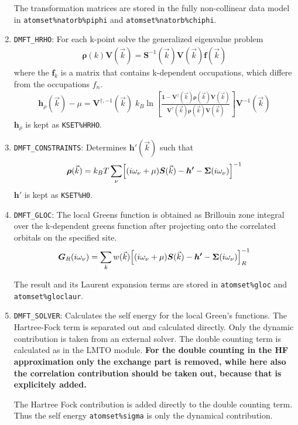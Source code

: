 \documentclass[11pt,a4paper]{report}
\newcommand{\mat}[1]{\bm{#1}}  %
\begin{document}
\begin{enumerate}
The transformation matrices are stored in the fully non-collinear data
model in \verb|atomset%natorb%piphi| and \verb|atomset%natorb%chiphi|.
%
\item \verb|DMFT_HRHO|: For each k-point solve the generalized
  eigenvalue problem
\begin{eqnarray*}
\mat{\rho}(k)\mat{V}(\vec{k})=
\mat{S}^{-1}(\vec{k})\mat{V}(\vec{k})\mat{f}(\vec{k})
\end{eqnarray*}
where the $\mat{f}_k$ is a matrix that contains k-dependent
occupations, which differe from the occupations $f_n$.
\begin{eqnarray}
\mat{h}_\rho(\vec{k})-\mu=\mat{V}^{\dagger,-1}(\vec{k})\; k_B
\ln\left[
\frac{\mat{1}-\mat{V}^\dagger(\vec{k})\mat{\rho}(\vec{k})\mat{V}(\vec{k})}
{\mat{V}^\dagger(\vec{k})\mat{\rho}(\vec{k})\mat{V}(\vec{k})}
\right]\mat{V}^{-1}(\vec{k})
\end{eqnarray}
$\mat{h}_\rho$ is kept as \verb|KSET%HRHO|.
%
\item \verb|DMFT_CONSTRAINTS|: Determines $\mat{h}'(\vec{k})$ such that
\begin{eqnarray}
\mat{\rho}(\vec{k})=k_BT\sum_\nu \Bigl[(i\omega_\nu+\mu)\mat{S}(\vec{k})-
\mat{h'}-\mat{\Sigma}(i\omega_\nu)\Bigr]^{-1}
\end{eqnarray}
$\mat{h'}$ is kept as \verb|KSET%H0|.
%
\item \verb|DMFT_GLOC|: The local Greens function is obtained as
  Brillouin zone integral over the k-dependent greens function after
  projecting onto the correlated orbitals on the specified site.
\begin{eqnarray}
\mat{G}_R(i\omega_\nu)=\sum_k w(\vec{k})
\Bigl[(i\omega_\nu+\mu)\mat{S}(\vec{k})-
\mat{h'}-\mat{\Sigma}(i\omega_\nu)\Bigr]^{-1}_R
\end{eqnarray}

The result and its Laurent expansion terms are stored in
\verb|atomset%gloc| and \verb|atomset%gloclaur|.
%
\item \verb|DMFT_SOLVER|: Calculates the self energy for the local
  Green's functions. The Hartree-Fock term is separated out and
  calculated directly. Only the dynamic contribution is taken from an
  external solver. The double counting term is calculated as in the
  LMTO module. \textbf{For the double counting in the HF approximation
    only the exchange part is removed, while here also the correlation
    contribution should be taken out, because that is explicitely
    added.}

  The Hartree Fock contribution is added directly to the double
  counting term. Thus the self energy \verb|atomset%sigma| is only
  the dynamical contribution.


\end{enumerate}
\end{document}
